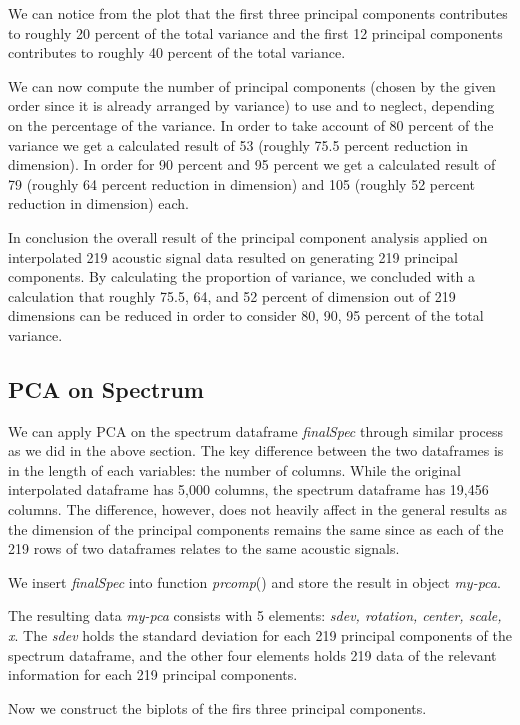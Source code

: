 We can notice from the plot that the first three principal components contributes to roughly 20 percent of the total variance and the first 12 principal components contributes to roughly 40 percent of the total variance.

We can now compute the number of principal components (chosen by the given order since it is already arranged by variance) to use and to neglect, depending on the percentage of the variance. In order to take account of 80 percent of the variance we get a calculated result of 53 (roughly 75.5 percent reduction in dimension). In order for 90 percent and 95 percent we get a calculated result of 79 (roughly 64 percent reduction in dimension) and 105 (roughly 52 percent reduction in dimension) each. 

In conclusion the overall result of the principal component analysis applied on interpolated 219 acoustic signal data resulted on generating 219 principal components. By calculating the proportion of variance, we concluded with a calculation that roughly 75.5, 64, and 52 percent of dimension out of 219 dimensions can be reduced in order to consider 80, 90, 95 percent of the total variance. 


\newpage
\subsection{PCA on Spectrum}


We can apply PCA on the spectrum dataframe \emph{finalSpec} through similar process as we did in the above section. The key difference between the two dataframes is in the length of each variables: the number of columns. While the original interpolated dataframe has 5,000 columns, the spectrum dataframe has 19,456 columns. The difference, however, does not heavily affect in the general results as the dimension of the principal components remains the same since as each of the 219 rows of two dataframes relates to the same acoustic signals.

We insert \emph{finalSpec} into function \emph{prcomp}() and store the result in object \emph{my-pca}. 

The resulting data \emph{my-pca} consists with 5 elements: \emph{sdev, rotation, center, scale, x}. The \emph{sdev} holds the standard deviation for each 219 principal components of the spectrum dataframe, and the other four elements holds 219 data of the relevant information for each 219 principal components. 

Now we construct the biplots of the firs three principal components.

